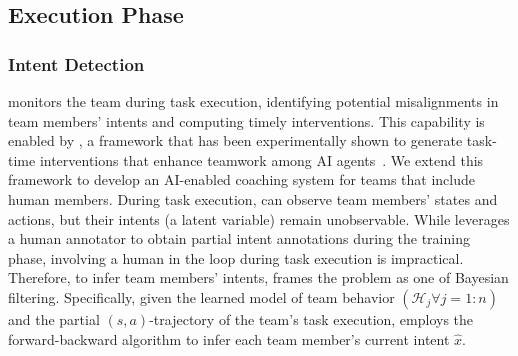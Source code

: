\subsection{Execution Phase}
\label{sec. tic execution}

\subsubsection{Intent Detection}
\coach monitors the team during task execution, identifying potential misalignments in team members' intents and computing timely interventions. This capability is enabled by \tic, a framework that has been experimentally shown to generate task-time interventions that enhance teamwork among AI agents~\cite{seo2023automated}. We extend this framework to develop an AI-enabled coaching system for teams that include human members.
During task execution, \coach can observe team members' states and actions, but their intents (a latent variable) remain unobservable. While \coach leverages a human annotator to obtain partial intent annotations during the training phase, involving a human in the loop during task execution is impractical. Therefore, to infer team members' intents, \coach frames the problem as one of Bayesian filtering. Specifically, given the learned model of team behavior $(\mathcal{H}_j \forall j = 1:n)$ and the partial $(s,a)$-trajectory of the team's task execution, \coach employs the forward-backward algorithm to infer each team member's current intent $\hat{x}$. 

